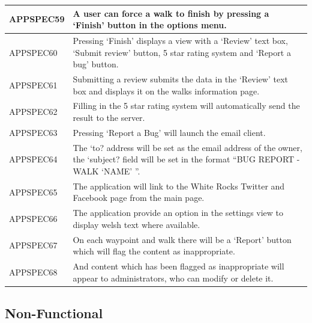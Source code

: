 \documentclass[11pt,a4paper]{article}
\begin{document}
\begin{longtable}{|p{2.5cm}p{13cm}|}
APPSPEC59 & A user can force a walk to finish by pressing a `Finish' button in the options menu. \\ \hline
APPSPEC60 & Pressing `Finish' displays a view with a `Review' text box, `Submit review' button, 5 star rating system and `Report a bug' button. \\ \hline
APPSPEC61 & Submitting a review submits the data in the `Review' text box and displays it on the walks information page.\\ \hline
APPSPEC62 & Filling in the 5 star rating system will automatically send the result to the server.\\ \hline
APPSPEC63 & Pressing `Report a Bug' will launch the email client. \\ \hline
APPSPEC64 & The `to? address will be set as the email address of the owner, the `subject? field will be set in the format ``BUG REPORT - WALK `NAME' ''.\\ \hline
APPSPEC65 & The application will link to the White Rocks Twitter and Facebook page from the main page.\\ \hline
APPSPEC66 & The application provide an option in the settings view to display welsh text where available. \\ \hline
APPSPEC67 & On each waypoint and walk there will be a `Report' button which will flag the content as inappropriate. \\ \hline
APPSPEC68 & And content which has been flagged as inappropriate will appear to administrators, who can modify or delete it. \\ \hline
\end{longtable}


\subsection{Non-Functional}
\label{sec:non-func-specs}
\end{document}
